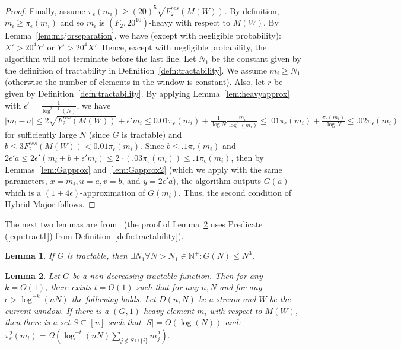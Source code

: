 \documentclass[11pt]{article}
\newtheorem{lem}{Lemma}
\begin{document}
\begin{proof}
Finally, assume $\pi_{\epsilon}(m_i) \ge (20)^5\sqrt{F^{res}_2(M(W))}$. By definition,
$m_i \ge \pi_{\epsilon}(m_i)$ and so $m_i$ is $(F_2,20^{10})$-heavy with respect to $M(W)$.
By Lemma~\ref{lem:majorseparation}, we have (except with negligible probability):
$X' > 20^4 Y' \text{ or } Y' > 20^4 X'$.
Hence, except with negligible probability, the algorithm will not terminate before the last line.
Let $N_1$ be the constant given by the definition of
tractability in Definition~\ref{defn:tractability}.  We assume $m_i \geq N_1$ (otherwise
the number of elements in the window is constant).  Also, let $r$
be given by Definition~\ref{defn:tractability}.
By applying Lemma~\ref{lem:heavyapprox} with $\epsilon' = \frac{1}{\log^{r+1}(N)}$, we have
$
|m_i - a| \le 2\sqrt{F^{res}_2(M(W))} +  \epsilon' m_i \leq 0.01\pi_{\epsilon}(m_i) + \frac{1}{\log N}\frac{m_i}{\log^r(m_i)} \leq
.01 \pi_{\epsilon}(m_i) + \frac{\pi_{\epsilon}(m_i)}{\log N} \leq .02 \pi_{\epsilon}(m_i)$ for sufficiently large $N$ (since $G$
is tractable) and
$b \le 3F^{res}_2(M(W)) < 0.01\pi_{\epsilon}(m_i)$.
Since $b \leq .1 \pi_{\epsilon}(m_i)$
and $2 \epsilon' a \leq 2 \epsilon' (m_i + b + \epsilon' m_i) \leq 2 \cdot (.03 \pi_{\epsilon}(m_i)) \leq .1 \pi_{\epsilon}(m_i)$,
then by Lemmas~\ref{lem:Gapprox} and~\ref{lem:Gapprox2} (which we apply with the same parameters,
$x=m_i, u = a, v = b$, and $y=2 \epsilon' a$), the algorithm outputs $G(a)$ which is a $(1 \pm 4\epsilon)$-approximation
of $G(m_i)$.  Thus, the second condition of Hybrid-Major follows.
\end{proof}

\noindent
The next two lemmas are from~\cite{BO10} (the proof of Lemma~\ref{lem:G-major} uses Predicate (\ref{eqn:tract1})
from Definition~\ref{defn:tractability}).
\begin{lem}\label{lem:tractcube}
If $G$ is tractable, then
$\exists N_1 \forall N>N_1 \in \mathbb{N^+}: G(N) \le N^3$.
\end{lem}
\begin{lem}\label{lem:G-major}
Let $G$ be a non-decreasing tractable function. Then for any $k = O(1)$, there
exists $t = O(1)$ such that for any $n,N$ and for any $\epsilon > \log^{-k}(nN)$
the following holds. Let $D(n,N)$ be a stream and $W$ be the current window.
If there is a $(G,1)$-heavy element $m_i$ with respect to $M(W)$, then there is
a set $S \subseteq [n]$ such that $|S| = O(\log(N))$ and:
$
\pi^2_{\epsilon}(m_i) = \Omega \left( \log^{-t}(nN)\sum_{j\notin S\cup\{i\}} m_j^2 \right).
$
\end{lem}
\end{document}
